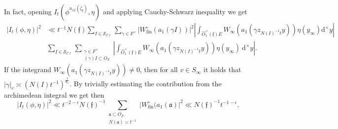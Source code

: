 \documentclass[a4paper,11pt]{amsart}
\theoremstyle{definition}
\newcommand{\N}{\mathbb{N}}
\newcommand{\cl}{\mathcal{C}\ell}
\newcommand{\fin}{\text{fin}}
\begin{document}
In fact, opening $I_t(\phi^{u_{12}(\zeta_\mathfrak{f})},\eta)$ and applying  Cauchy-Schwarz inequality we get \begin{align*}\vert{I_t}(\phi,\eta)\vert^2&\ll t^{-1}N(\mathfrak{f})\sum_{I \in \mathcal{S}_{\cl}}\sum_{\gamma \in F^{\times}}\vert{W_{\fin}^{\circ}(a_1(\gamma I))}\vert^2\left\vert{\int_{\widehat{O}_1^\times(\mathfrak{f})E}W_{\infty}(a_1(\gamma z_{N(I)^{-1}t} y))\eta(y_{\infty}) \mathrm{d}^{\times}y}\right\vert
\\&\sum_{I\in \mathcal{S}_{\cl}}\sum_{\substack{\gamma \in F^{\times}\\(\gamma) I\subset O_F}}\left\vert{\int_{\widehat{O}_1^\times(\mathfrak{f})E}W_{\infty}(a_1(\gamma z_{N(I)^{-1}t}y))\eta(y_\infty)  \ \mathrm{d}^{\times}y}\right\vert.\end{align*}
If the integrand $W_{\infty}(a_1(\gamma z_{N(I)^{-1}t}y))\neq 0$, then for all $v\in S_{\infty}$ it holds that $\vert{\gamma}\vert_v \asymp (N(I)t^{-1})^{\frac{1}{d_v}}$. By trivially estimating the contribution from the archimedean integral we get then 
\begin{equation*}
    \vert{I_t(\phi,\eta)}\vert^2 \ll t^{-2-\epsilon}N(\mathfrak{f})^{-1}\sum_{\substack{\mathfrak{a}\subset O_F\\N(\mathfrak{a})\asymp t^{-1}}}\vert{W^{\circ}_{\fin}(a_1(\mathfrak{a})}\vert^2  \ll N(\mathfrak{f})^{-1}t^{-1-\epsilon}.
\end{equation*}
\end{document}
